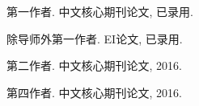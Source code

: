 
\begin{publications}{99}
    \item\textsc{第一作者}. {中文核心期刊论文}, 已录用.  
    \item\textsc{除导师外第一作者}. {EI论文}, 已录用.
    \item\textsc{第二作者}. {中文核心期刊论文}, 2016.  
    \item\textsc{第四作者}. {中文核心期刊论文}, 2016.
\end{publications}
